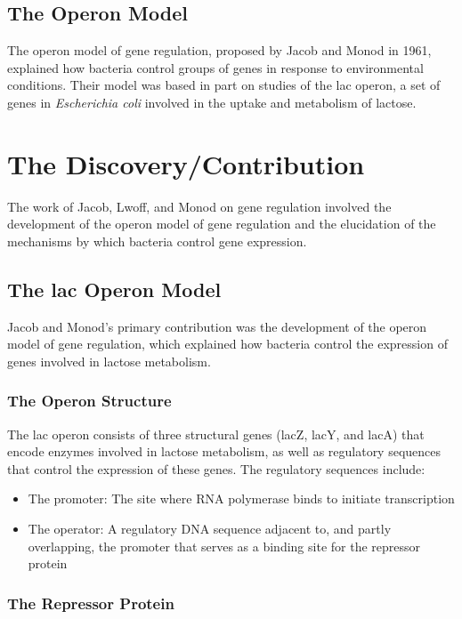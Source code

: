 \subsection{The Operon Model}

The operon model of gene regulation, proposed by Jacob and Monod in 1961, explained how bacteria control groups of genes in response to environmental conditions. Their model was based in part on studies of the lac operon, a set of genes in \textit{Escherichia coli} involved in the uptake and metabolism of lactose.

\section{The Discovery/Contribution}

The work of Jacob, Lwoff, and Monod on gene regulation involved the development of the operon model of gene regulation and the elucidation of the mechanisms by which bacteria control gene expression.

\subsection{The lac Operon Model}

Jacob and Monod's primary contribution was the development of the operon model of gene regulation, which explained how bacteria control the expression of genes involved in lactose metabolism.

\subsubsection{The Operon Structure}

The lac operon consists of three structural genes (lacZ, lacY, and lacA) that encode enzymes involved in lactose metabolism, as well as regulatory sequences that control the expression of these genes. The regulatory sequences include:

\begin{itemize}
\item The promoter: The site where RNA polymerase binds to initiate transcription
\item The operator: A regulatory DNA sequence adjacent to, and partly overlapping, the promoter that serves as a binding site for the repressor protein
\end{itemize}

\subsubsection{The Repressor Protein}

